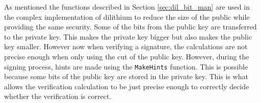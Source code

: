 As mentioned the functions described in Section \ref{sec:dil_bit_man} are used in the complex implementation of dilithium to reduce the size of the public while providing the same security. Some of the bits from the public key are transferred to the private key. This makes the private key bigger but also makes the public key smaller. However now when verifying a signature, the calculations are not precise enough when only using the cut of the public key. However, during the signing process, hints are made using the \texttt{MakeHints} function. This is possible because some bits of the public key are stored in the private key. This is what allows the verification calculation to be just precise enough to correctly decide whether the verification is correct. \cite{y0VQZiTmHEg2xvPn}
